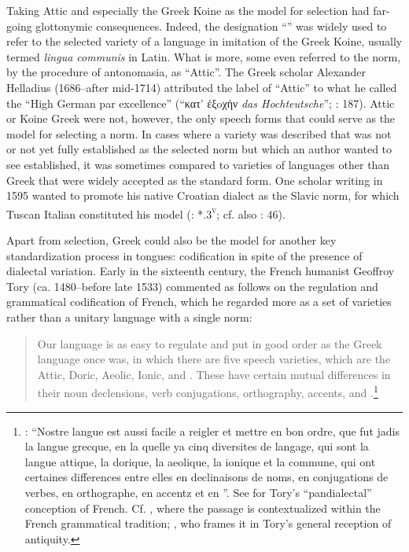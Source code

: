 Taking Attic and especially the Greek Koine as the model for selection had far-going glottonymic consequences. Indeed, the designation “” was widely used to refer to the selected variety of a  language in imitation of the Greek Koine, usually termed \textit{lingua communis} in Latin. What is more, some even referred to the  norm, by the procedure of antonomasia, as “Attic”. The Greek scholar Alexander Helladius (1686–after mid-1714) attributed the label of “Attic” to what he called the “High German par excellence” (“κατ’ ἐξoχὴν \textit{das Hochteutsche}”; \citealt{Helladius1714}: 187). Attic or Koine Greek were not, however, the only speech forms that could serve as the model for selecting a  norm. In cases where a  variety was described that was not or not yet fully established as the selected norm but which an author wanted to see established, it was sometimes compared to varieties of languages other than Greek that were widely accepted as the standard form. One scholar writing in 1595 wanted to promote his native Croatian dialect as the Slavic norm, for which Tuscan Italian constituted his model (\citealt{Veranzio1595}: *.3\textsc{\textsuperscript{v}}; cf. also \citealt{Schoppe1636}: 46).

Apart from selection, Greek could also be the model for another key standardization process in  tongues: codification in spite of the presence of dialectal variation. Early in the sixteenth century, the French humanist Geoffroy Tory (ca. 1480–before late 1533) commented as follows on the regulation and grammatical codification of French, which he regarded more as a set of varieties rather than a unitary language with a single norm:

\begin{quote}
Our language is as easy to regulate and put in good order as the Greek language once was, in which there are five speech varieties, which are the Attic, Doric, Aeolic, Ionic, and . These have certain mutual differences in their noun declensions, verb conjugations, orthography, accents, and .\footnote{\citet[\textsc{iv}\textsc{\textsuperscript{v}}\textsc{–v}\textsc{\textsuperscript{r}}]{Tory1529}: “Nostre langue est aussi facile a reigler et mettre en bon ordre, que fut jadis la langue grecque, en la quelle ya cinq diversites de langage, qui sont la langue attique, la dorique, la aeolique, la ionique et la commune, qui ont certaines differences entre elles en declinaisons de noms, en conjugations de verbes, en orthographe, en accentz et en ”. See \citet[466--467]{Trudeau1983} for Tory’s “pandialectal” conception of French. Cf. \citet[19--20]{Defaux2003}, where the passage is contextualized within the French grammatical tradition; \citet[23]{Cordier2006}, who frames it in Tory’s general reception of antiquity.}
\end{quote}

